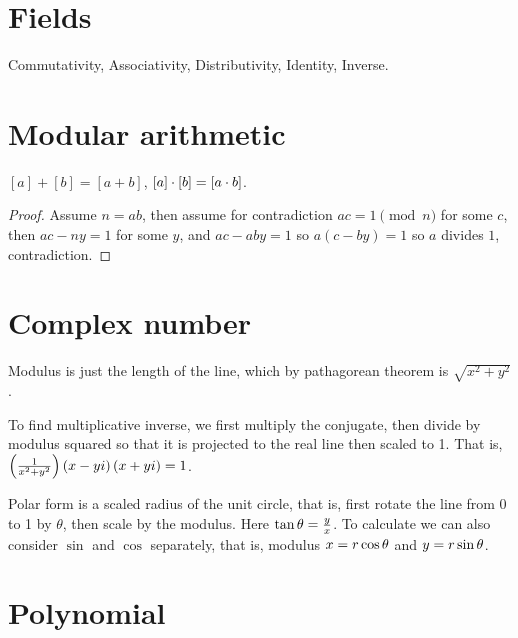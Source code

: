 \documentclass[11pt, cyan, night, 1in]{LatexTemplate/hw}
\begin{document}

\tableofcontents
\np

\section{Fields}

Commutativity, Associativity, Distributivity, Identity, Inverse.

\section{Modular arithmetic}

$[a]+[b]=[a+b]$, $[a]\cdot[b]=[a\cdot b]$.


\begin{proof}
    Assume $n=ab$, then assume for contradiction $ac=1 \pmod n$ for some $c$, then $ac-ny=1$ for some $y$, and $ac-aby=1$ so $a(c-by)=1$ so $a$ divides $1$, contradiction.
\end{proof}



\section{Complex number}

Modulus is just the length of the line, which by pathagorean theorem is $\sqrt{x^2+y^2}$.

To find multiplicative inverse, we first multiply the conjugate, then divide by modulus squared so that it is projected to the real line then scaled to 1. That is, $\left(\frac1{x^2+y^2}\right)\left(x-yi\right)\left(x+yi\right)=1$.

Polar form is a scaled radius of the unit circle, that is, first rotate the line from 0 to 1 by $\theta$, then scale by the modulus. Here $\tan\theta=\frac yx$. To calculate we can also consider $\sin$ and $\cos$ separately, that is, modulus $x=r\cos\theta$ and $y=r\sin\theta$.

\section{Polynomial}
\end{document}
